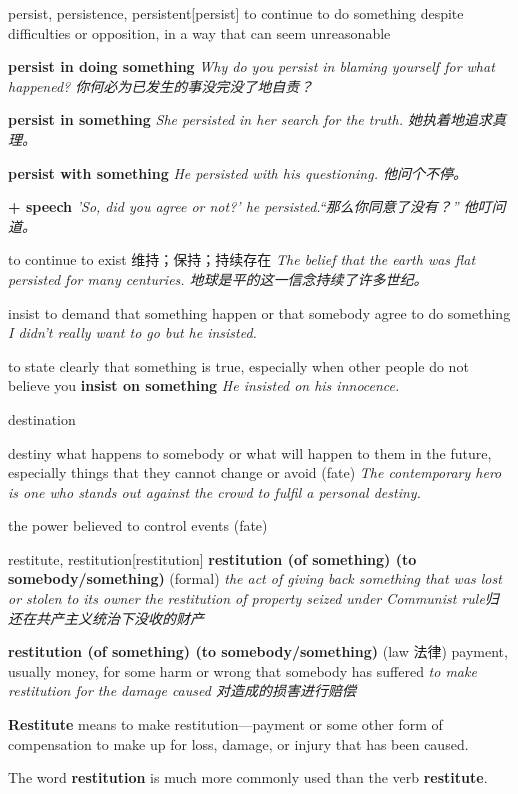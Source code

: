 \begin{DefWord}{persist, persistence, persistent}[persist]
    to continue to do something despite difficulties or opposition, in a way that can seem unreasonable

    \textbf{persist in doing something} \textit{Why do you persist in blaming yourself for what happened? 你何必为已发生的事没完没了地自责？}

    \textbf{persist in something} \textit{She persisted in her search for the truth. 她执着地追求真理。}

    \textbf{persist with something} \textit{He persisted with his questioning. 他问个不停。}

    \textbf{+ speech} \textit{'So, did you agree or not?' he persisted.“那么你同意了没有？” 他叮问道。}

    to continue to exist 维持；保持；持续存在
    \textit{The belief that the earth was flat persisted for many centuries. 地球是平的这一信念持续了许多世纪。}
\end{DefWord}

\begin{DefWord}{insist}
    to demand that something happen or that somebody agree to do something
    \textit{I didn't really want to go but he insisted.}

    to state clearly that something is true, especially when other people do not believe you
    \textbf{insist on something} \textit{He insisted on his innocence.}
\end{DefWord}

\begin{DefWord}{destination}
\end{DefWord}

\begin{DefWord}{destiny}
    what happens to somebody or what will happen to them in the future, especially things that they cannot change or avoid (fate)
    \textit{The contemporary hero is one who stands out against the crowd to fulfil a personal destiny.}

    the power believed to control events (fate)
\end{DefWord}

\begin{DefWord}{restitute, restitution}[restitution]
    \textbf{restitution (of something) (to somebody/something)} (formal) \textit{the act of giving back something that was lost or stolen to its owner}
    \textit{the restitution of property seized under Communist rule归还在共产主义统治下没收的财产}

    \textbf{restitution (of something) (to somebody/something)} (law 法律) payment, usually money, for some harm or wrong that somebody has suffered
    \textit{to make restitution for the damage caused 对造成的损害进行赔偿}

    \textbf{Restitute} means to make restitution—payment or some other form of compensation to make up for loss, damage, or injury that has been caused.

    The word \textbf{restitution} is much more commonly used than the verb \textbf{restitute}.
\end{DefWord}

